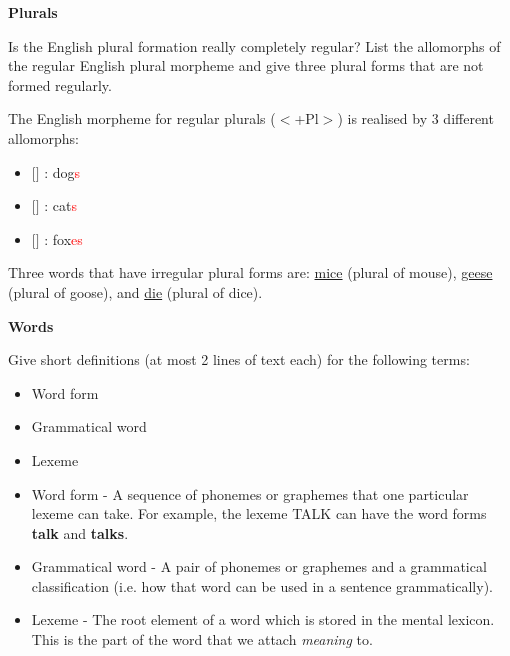 \documentclass[11pt]{article}
\begin{document}
\vspace*{0.5cm} %

\begin{problem}{2}
\textbf{Plurals}

Is the English plural formation really completely regular? List the allomorphs of the regular English plural morpheme and give three plural forms that are not formed regularly.
\end{problem}

\begin{solution}
The English morpheme for regular plurals ($<$+Pl$>$) is realised by 3 different allomorphs:
\begin{itemize}
	\item $[$$]$ : dog\textcolor{red}{s}
	\item $[$$]$ : cat\textcolor{red}{s}
	\item $[$$]$ : fox\textcolor{red}{es}
\end{itemize}

Three words that have irregular plural forms are: \underline{mice} (plural of mouse), \underline{geese} (plural of goose), and \underline{die} (plural of dice). 

\end{solution}

\vspace*{0.5cm}

\begin{problem}{3}
\textbf{Words}

Give short definitions (at most 2 lines of text each) for the following terms:
\begin{itemize}
	\item Word form
	\item Grammatical word
	\item Lexeme
\end{itemize}

\end{problem}

\begin{solution}
\begin{itemize}
	\item Word form - A sequence of phonemes or graphemes that one particular lexeme can take.  For example, the lexeme TALK can have the word forms \textbf{talk} and \textbf{talks}.
	\item Grammatical word - A pair of phonemes or graphemes and a grammatical classification (i.e. how that word can be used in a sentence grammatically).
	\item Lexeme - The root element of a word which is stored in the mental lexicon.  This is the part of the word that we attach \textit{meaning} to.
\end{itemize}
\end{solution}
\end{document}
